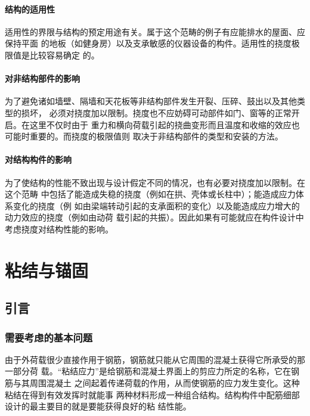 \documentclass[12pt,a4paper]{book}
\begin{document}
\subsubsection{结构的适用性}

适用性的界限与结构的预定用途有关。属于这个范畴的例子有应能排水的屋面、应保持平面
的地板（如健身房）以及支承敏感的仪器设备的构件。适用性的挠度极限值是比较容易确定
的。

\subsubsection{对非结构部件的影响}

为了避免诸如墙壁、隔墙和天花板等非结构部件发生开裂、压碎、鼓出以及其他类型的损坏，
必须对挠度加以限制。挠度也不应妨碍可动部件如门、窗等的正常开启。在这里不仅时由于
重力和横向荷载引起的挠曲变形而且温度和收缩的效应也可能时重要的。而挠度的极限值则
取决于非结构部件的类型和安装的方法。

\subsubsection{对结构构件的影响}

为了使结构的性能不致出现与设计假定不同的情况，也有必要对挠度加以限制。在这个范畴
中包括了能造成失稳的挠度（例如在拱、壳体或长柱中）；能造成应力体系变化的挠度（例
如由梁端转动引起的支承面积的变化）以及能造成应力增大的动力效应的挠度（例如由动荷
载引起的共振）。因此如果有可能就应在构件设计中考虑挠度对结构性能的影响。

\chapter{粘结与锚固}

\section{引言}

\subsection{需要考虑的基本问题}

由于外荷载很少直接作用于钢筋，钢筋就只能从它周围的混凝土获得它所承受的那一部分荷
载。“粘结应力”是给钢筋和混凝土界面上的剪应力所定的名称，它在钢筋与其周围混凝土
之间起着传递荷载的作用，从而使钢筋的应力发生变化。这种粘结在得到有效发挥时就能事
两种材料形成一种组合结构。结构构件中配筋细部设计的最主要目的就是要能获得良好的粘
结性能。
\end{document}
